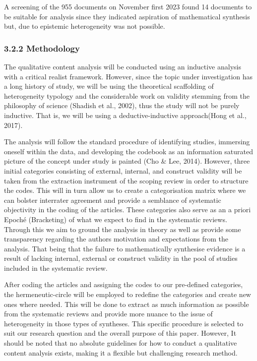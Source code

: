 \documentclass[
  letterpaper,
  DIV=11,
  numbers=noendperiod]{scrartcl}
\begin{document}
A screening of the 955 documents on November first 2023 found 14
documents to be suitable for analysis since they indicated aspiration of
mathematical synthesis but, due to epistemic heterogeneity was not
possible.

\hypertarget{methodology}{%
\subsubsection{3.2.2 Methodology}\label{methodology}}

The qualitative content analysis will be conducted using an inductive
analysis with a critical realist framework. However, since the topic
under investigation has a long history of study, we will be using the
theoretical scaffolding of heterogeneity typology and the considerable
work on validity stemming from the philosophy of science (Shadish et
al., 2002), thus the study will not be purely inductive. That is, we
will be using a deductive-inductive approach(Hong et al., 2017).

The analysis will follow the standard procedure of identifying studies,
immersing oneself within the data, and developing the codebook as an
information saturated picture of the concept under study is painted (Cho
\& Lee, 2014). However, three initial categories consisting of external,
internal, and construct validity will be taken from the extraction
instrument of the scoping review in order to structure the codes. This
will in turn allow us to create a categorisation matrix where we can
bolster interrater agreement and provide a semblance of systematic
objectivity in the coding of the articles. These categories also serve
as an a priori Epoché (Bracketing) of what we expect to find in the
systematic reviews. Through this we aim to ground the analysis in theory
as well as provide some transparency regarding the authors motivation
and expectations from the analysis. That being that the failure to
mathematically synthesise evidence is a result of lacking internal,
external or construct validity in the pool of studies included in the
systematic review.

After coding the articles and assigning the codes to our pre-defined
categories, the hermeneutic-circle will be employed to redefine the
categories and create new ones where needed. This will be done to
extract as much information as possible from the systematic reviews and
provide more nuance to the issue of heterogeneity in those types of
syntheses. This specific procedure is selected to suit our research
question and the overall purpose of this paper. However, It should be
noted that no absolute guidelines for how to conduct a qualitative
content analysis exists, making it a flexible but challenging research
method.
\end{document}
